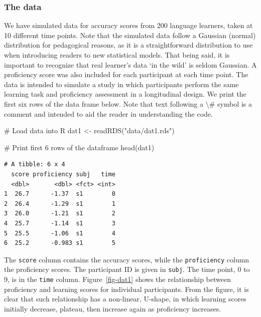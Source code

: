 \documentclass[
  letterpaper,
  DIV=11,
  numbers=noendperiod]{scrartcl}
\newenvironment{Shaded}{\begin{snugshade}}{\end{snugshade}}
\newcommand{\CommentTok}[1]{\textcolor[rgb]{0.37,0.37,0.37}{#1}}
\newcommand{\FunctionTok}[1]{\textcolor[rgb]{0.28,0.35,0.67}{#1}}
\newcommand{\NormalTok}[1]{\textcolor[rgb]{0.00,0.23,0.31}{#1}}
\newcommand{\OtherTok}[1]{\textcolor[rgb]{0.00,0.23,0.31}{#1}}
\newcommand{\StringTok}[1]{\textcolor[rgb]{0.13,0.47,0.30}{#1}}
\begin{document}
\subsubsection{The data}\label{the-data}

We have simulated data for accuracy scores from 200 language learners,
taken at 10 different time points. Note that the simulated data follow a
Gaussian (normal) distribution for pedagogical reasons, as it is a
straightforward distribution to use when introducing readers to new
statistical models. That being said, it is important to recognize that
real learner's data `in the wild' is seldom Gaussian. A proficiency
score was also included for each participant at each time point. The
data is intended to simulate a study in which participants perform the
same learning task and proficiency assessment in a longitudinal design.
We print the first six rows of the data frame below. Note that text
following a \textbackslash\# symbol is a comment and intended to aid the
reader in understanding the code.

\begin{Shaded}
\begin{Highlighting}[]
\CommentTok{\# Load data into R}
\NormalTok{dat1 }\OtherTok{\textless{}{-}} \FunctionTok{readRDS}\NormalTok{(}\StringTok{"data/dat1.rds"}\NormalTok{)}

\CommentTok{\# Print first 6 rows of the dataframe}
\FunctionTok{head}\NormalTok{(dat1)}
\end{Highlighting}
\end{Shaded}

\begin{verbatim}
# A tibble: 6 x 4
  score proficiency subj   time
  <dbl>       <dbl> <fct> <int>
1  26.7      -1.37  s1        0
2  26.4      -1.29  s1        1
3  26.0      -1.21  s1        2
4  25.7      -1.14  s1        3
5  25.5      -1.06  s1        4
6  25.2      -0.983 s1        5
\end{verbatim}

The \texttt{score} column contains the accuracy scores, while the
\texttt{proficiency} column the proficiency scores. The participant ID
is given in \texttt{subj}. The time point, 0 to 9, is in the
\texttt{time} column. Figure~\ref{fig-dat1} shows the relationship
between proficiency and learning scores for individual participants.
From the figure, it is clear that such relationship has a non-linear,
U-shape, in which learning scores initially decrease, plateau, then
increase again as proficiency increases.
\end{document}
